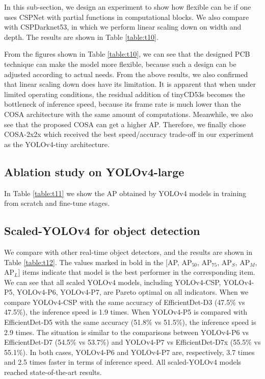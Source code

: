 \documentclass[10pt,twocolumn,letterpaper]{article}
\begin{document}
In this sub-section, we design an experiment to show how flexible can be if one uses CSPNet with partial functions in computational blocks.  We also compare with CSPDarknet53, in which we perform linear scaling down on width and depth.  The results are shown in Table \ref{table:t10}.

From the figures shown in Table \ref{table:t10}, we can see that the designed PCB technique can make the model more flexible, because such a design can be adjusted according to actual needs.  From the above results, we also confirmed that linear scaling down does have its limitation.  It is apparent that when under limited operating conditions, the residual addition of tinyCD53s becomes the bottleneck of inference speed, because its frame rate is much lower than the COSA architecture with the same amount of computations.  Meanwhile, we also see that the proposed COSA can get a higher AP.  Therefore, we finally chose COSA-2x2x which received the best speed/accuracy trade-off in our experiment as the YOLOv4-tiny architecture.

\subsection{Ablation study on YOLOv4-large}

In Table \ref{table:t11} we show the AP obtained by YOLOv4 models in training from scratch and fine-tune stages. 

\subsection{Scaled-YOLOv4 for object detection}

We compare with other real-time object detectors, and the results are shown in Table \ref{table:t12}.  The values marked in bold in the [AP, AP$_{50}$, AP$_{75}$, AP$_S$, AP$_M$, AP$_L$] items indicate that model is the best performer in the corresponding item.  We can see that all scaled YOLOv4 models, including YOLOv4-CSP, YOLOv4-P5, YOLOv4-P6, YOLOv4-P7, are Pareto optimal on all indicators.  When we compare YOLOv4-CSP with the same accuracy of EfficientDet-D3 (47.5\% vs 47.5\%), the inference speed is 1.9 times.  When YOLOv4-P5 is compared with EfficientDet-D5 with the same accuracy (51.8\% vs 51.5\%), the inference speed is 2.9 times.  The situation is similar to the comparisons between YOLOv4-P6 vs EfficientDet-D7 (54.5\% vs 53.7\%) and YOLOv4-P7 vs EfficientDet-D7x (55.5\% vs 55.1\%).  In both cases, YOLOv4-P6 and YOLOv4-P7 are, respectively, 3.7 times and 2.5 times faster in terms of inference speed.  All scaled-YOLOv4 models reached state-of-the-art results.
\end{document}
